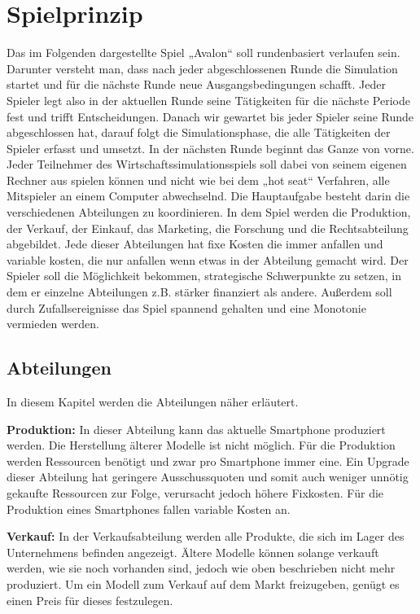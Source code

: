 \section{Spielprinzip}
Das im Folgenden dargestellte Spiel „Avalon“ soll rundenbasiert verlaufen sein. Darunter versteht man, dass nach jeder abgeschlossenen Runde die Simulation startet und für die nächste Runde neue Ausgangsbedingungen schafft. Jeder Spieler legt also in der aktuellen Runde seine Tätigkeiten für die nächste Periode fest und trifft Entscheidungen. Danach wir gewartet bis jeder Spieler seine Runde abgeschlossen hat, darauf folgt die Simulationsphase, die alle Tätigkeiten der Spieler erfasst und umsetzt. In der nächsten Runde beginnt das Ganze von vorne. Jeder Teilnehmer des Wirtschaftssimulationsspiels soll dabei von seinem eigenen Rechner aus spielen können und nicht wie bei dem „hot seat“ Verfahren, alle Mitspieler an einem Computer abwechselnd. Die Hauptaufgabe besteht darin die verschiedenen Abteilungen zu koordinieren. In dem Spiel werden die Produktion, der Verkauf, der Einkauf, das Marketing, die Forschung und die Rechtsabteilung abgebildet. Jede dieser Abteilungen hat fixe Kosten die immer anfallen und variable kosten, die nur anfallen wenn etwas in der Abteilung gemacht wird. Der Spieler soll die Möglichkeit bekommen, strategische Schwerpunkte zu setzen, in dem er einzelne Abteilungen z.B. stärker finanziert als andere. Außerdem soll durch Zufallsereignisse das Spiel spannend gehalten und eine Monotonie vermieden werden.

\subsection{Abteilungen}
In diesem Kapitel werden  die Abteilungen näher erläutert.

\textbf{Produktion: }
In dieser Abteilung kann das aktuelle Smartphone produziert werden. Die Herstellung älterer Modelle ist nicht möglich. Für die Produktion  werden Ressourcen benötigt und zwar pro Smartphone immer eine. Ein Upgrade dieser Abteilung hat geringere Ausschussquoten  und somit auch weniger unnötig gekaufte Ressourcen zur Folge, verursacht jedoch höhere Fixkosten. Für die Produktion eines Smartphones fallen variable Kosten an.

\textbf{Verkauf:} 
In der Verkaufsabteilung werden alle Produkte, die sich im Lager des Unternehmens befinden angezeigt. Ältere Modelle können solange verkauft werden, wie sie noch vorhanden sind, jedoch wie oben beschrieben nicht mehr produziert. Um ein Modell zum Verkauf auf dem Markt freizugeben, genügt es einen Preis für dieses festzulegen.

